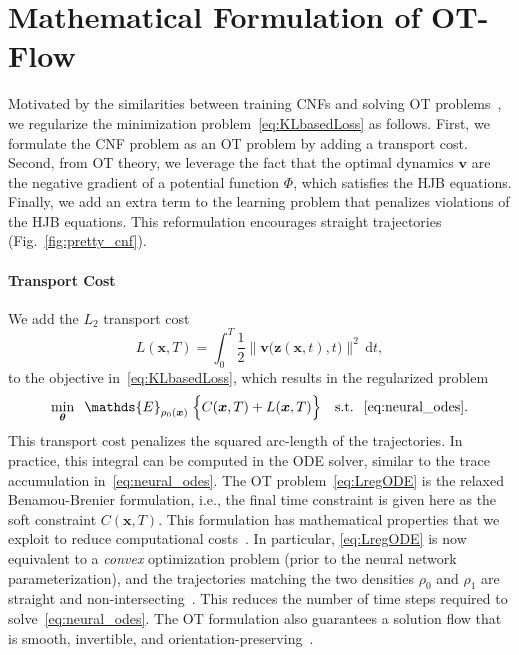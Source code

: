 \documentclass[letterpaper]{article}
\newcommand{\bfth}{\boldsymbol{\theta}}
\newcommand{\bfv}{\mathbf{v}}
\newcommand{\bfx}{\boldsymbol{x}}
\newcommand{\bfz}{\boldsymbol{z}}
\newcommand{\model}{OT-Flow} %
\def\du{\ensuremath{\mathrm{d}}}
\newcommand{\E}{\ensuremath{\mathds{E}}}
\begin{document}
\section{Mathematical Formulation of \model{}}
\label{sec:OMT-Flow}

    Motivated by the similarities between training CNFs and solving OT problems~\cite{benamou2000computational,peyre2018computational}, we regularize the minimization problem~\eqref{eq:KLbasedLoss} as follows. 
    First, we formulate the CNF problem as an OT problem by adding a transport cost.
    Second, from OT theory, we leverage the fact that the optimal dynamics $\bfv$ are the negative gradient of a potential function $\Phi$, which satisfies the HJB equations. Finally, we add an extra term to the learning problem that penalizes violations of the HJB equations. This reformulation encourages straight trajectories (Fig.~\ref{fig:pretty_cnf}).


    
    \paragraph{Transport Cost} We add the $L_2$ transport cost
    \begin{equation}
		\label{eq:L2}
		L(\bfx,T) = \int_0^T \frac{1}{2}\| \bfv \big( \bfz(\bfx,t),t \big) \|^2 \, \du t,
	\end{equation}
    to the objective in~\eqref{eq:KLbasedLoss}, which results in the regularized problem
    \begin{equation}
		\label{eq:LregODE}
		\min_{\bfth} \;\; \E_{\rho_0(\bfx)} \; \Big\{C(\bfx, T) + L(\bfx,T) \Big\} \quad \text{s.t. } \; \eqref{eq:neural_odes}.
	\end{equation}
    This transport cost penalizes the squared arc-length of the trajectories. 
    In practice, this integral can be computed in the ODE solver, similar to the trace accumulation in~\eqref{eq:neural_odes}.
    The OT problem~\eqref{eq:LregODE} is the relaxed Benamou-Brenier formulation, i.e., the final time constraint is given here as the soft constraint $C(\bfx, T)$. This formulation has mathematical properties that we exploit to reduce computational costs~\cite{evans1997partial,villani2008optimal,lin2019fluid,finlay2020train}.
    In particular, \eqref{eq:LregODE} is now equivalent to a \emph{convex} optimization problem (prior to the neural network parameterization), and the trajectories matching the two densities $\rho_0$ and $\rho_1$ are straight and non-intersecting~\cite{gangbo1996geometry}. This reduces the number of time steps required to solve~\eqref{eq:neural_odes}.
    The OT formulation also guarantees a solution flow that is smooth, invertible, and orientation-preserving~\cite{ambrosio2008gradient}.
\end{document}
